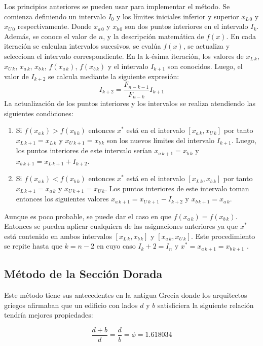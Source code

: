 Los principios anteriores se pueden usar para implementar el método. Se comienza definiendo un intervalo $I_0$ y los  límites iniciales inferior y superior $x_{L\,0}$ y $x_{U\,0}$ respectivamente. Donde $x_{a\,0}$ y  $x_{b\,0}$ son dos puntos interiores en el intervalo $I_k$. Además, se conoce el valor de $n$, y la descripción matemática de $f(x)$. En cada iteración se calculan intervalos sucesivos, se evalúa $f(x)$, se actualiza y selecciona el intervalo correspondiente. En la k-ésima iteración, los valores de  $x_{L\,k}$, $x_{U\,k}$, $x_{a\,k}$, $x_{b\,k}$, $f(x_{a\,k})$,  $f(x_{b\,k})$ y el intervalo $I_{k + 1}$ son conocidos. Luego, el valor de $I_{k + 2}$ se calcula mediante la siguiente expresión:
\begin{equation}
 I_{k+2} = \frac{F_{n-k-1}}{ F_{n-k}}I_{k+1}
 \end{equation}
La actualización de los puntos interiores y los intervalos se realiza atendiendo las siguientes condiciones:
\begin{enumerate}
\item Si $f(x_{a\,k}) > f(x_{b\,k})$ entonces $x^*$ está en el intervalo $[ x_{a\,k}, x_{U\,k}]$ por tanto $ x_{L\,k+1} =x_{L\,k}$ y $ x_{U\,k+1} =x_{b\,k}$  son los nuevos límites del intervalo  $I_{k + 1}$. Luego, los puntos interiores de este intervalo serían $x_{a\,k+1} =x_{b\,k}$ y  $x_{b\,k+1} =x_{L\,k+1}+I_{k+2}$.

\item Si $f(x_{a\,k}) < f(x_{b\,k})$ entonces $x^*$ está en el intervalo $[x_{L\,k}, x_{b\,k}]$ por tanto $ x_{L\,k+1} =x_{a\,k}$ y $ x_{U\,k+1} =x_{U\,k}$. Los puntos interiores de este intervalo toman entonces los siguientes valores $x_{a\,k+1} =x_{U\,k+1}-I_{k+2}$ y  $x_{b\,k+1} =x_{a\,k}$.
\end{enumerate}

Aunque es poco probable, se puede dar el caso en que $f(x_{a\,k}) = f(x_{b\,k})$. Entonces se pueden aplicar cualquiera de las asignaciones anteriores ya que $x^*$ está contenido en ambos intervalos  $[x_{L\,k}, x_{b\,k}]$ y  $[ x_{a\,k}, x_{U\,k}]$. Este procedimiento se repite hasta que $k = n - 2$ en cuyo caso $I_k + 2 = I_n$ y $x^* = x_{a\,k+1} =  x_{b\,k+1}$ \cite{antoniou_practical_2007}.

\subsection{Método de la Sección Dorada}
Este método tiene sus antecedentes en la antigua Grecia donde los arquitectos griegos afirmaban que un edificio con lados $d$ y $b$ satisficiera la siguiente relación tendría mejores propiedades:
\begin{center}
\begin{equation}
\frac{d+b}{d}=\frac{d}{b}= \phi=1.618034
\end{equation}
\end{center}

